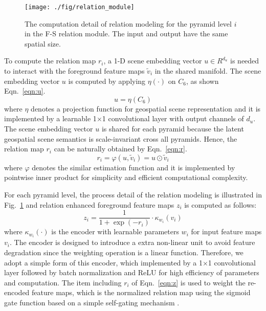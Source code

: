 \documentclass[10pt,twocolumn,letterpaper]{article}
\begin{document}
\begin{figure}[hbt]
   \begin{center}
      \texttt{[image: ./fig/relation\_module]}
   \end{center}
   \caption{The computation detail of relation modeling for the pyramid level $i$ in the F-S relation module. The input and output have the same spatial size.}
   \label{fig:relation_module}
\end{figure}

To compute the relation map $r_i$, a 1-D scene embedding vector $u \in R^{d_u}$ is needed to interact with the foreground feature maps $\tilde{v}_i$ in the shared manifold.
The scene embedding vector $u$ is computed by applying $\eta(\cdot)$ on $C_6$, as shown Eqn.~\ref{eqn:u}.
\begin{equation}
   \label{eqn:u}
   u = \eta(C_6)
\end{equation}
where $\eta$ denotes a projection function for geospatial scene representation and it is implemented by a learnable 1$\times$1 convolutional layer with output channels of $d_u$.
The scene embedding vector $u$ is shared for each pyramid because the latent geospatial scene semantics is scale-invariant cross all pyramids.
Hence, the relation map $r_i$ can be naturally obtained by Eqn.~\ref{eqn:r}.
\begin{equation}
   \label{eqn:r}
   r_i = \varphi(u, \tilde{v}_i) = u\odot \tilde{v}_i
\end{equation}
where $\varphi$ denotes the similar estimation function and it is implemented by pointwise inner product for simplicity and efficient computational complexity.


For each pyramid level, the process detail of the relation modeling is illustrated in Fig.~\ref{fig:relation_module} and relation enhanced foreground feature maps $z_i$ is computed as follows:
\begin{equation}
   \label{eqn:z}
   z_i = \frac{1}{1+\exp(-r_i)} \cdot \kappa_{w_i}(v_i)
\end{equation}
where $\kappa_{w_i}(\cdot)$ is the encoder with learnable parameters $w_i$ for input feature maps $v_i$.
The encoder is designed to introduce a extra non-linear unit to avoid feature degradation since the weighting operation is a linear function.
Therefore, we adopt a simple form of this encoder, which implemented by a 1$\times$1 convolutional layer followed by batch normalization and ReLU for high efficiency of parameters and computation.
The item including $r_i$ of Eqn.~\ref{eqn:z} is used to weight the re-encoded feature maps,
which is the normalized relation map using the sigmoid gate function based on a simple self-gating mechanism \cite{hu2018squeeze}.
\end{document}
